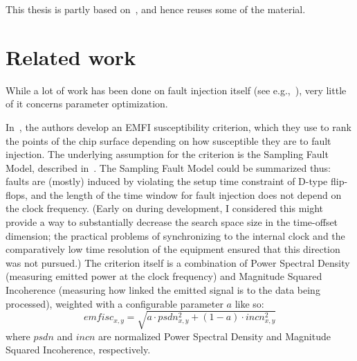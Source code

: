 \documentclass[times, utf8, diplomski]{fer}
\begin{document}


This thesis is partly based on~\cite{paper_FDTC2018}, and hence reuses some
of the material.

\section{Related work}\label{sec:related_work}
While a lot of work has been done on fault injection itself (see
e.g.,~\cite{Kommerling, boneh_demillo_lipton, nsamwel_africacrypt, impeccable_circuits, FI_crowbars}),
very little of it concerns parameter optimization.

In~\cite{madau2017fault}, the authors develop an EMFI susceptibility criterion,
which they use to rank the points of the chip surface depending on how susceptible
they are to fault injection. The underlying assumption for the criterion is the
Sampling Fault Model, described in~\cite{ordas2015injection}. The Sampling Fault
Model could be summarized thus: faults are (mostly) induced by violating the
setup time constraint of D-type flip-flops, and the length of the time window
for fault injection does not depend on the clock frequency. (Early on during
development, I considered this might provide a way to substantially decrease
the search space size in the time-offset dimension; the practical problems of
synchronizing to the internal clock and the comparatively low time resolution
of the equipment ensured that this direction was not pursued.) The criterion
itself is a combination of Power Spectral Density (measuring emitted power at
the clock frequency) and Magnitude Squared Incoherence (measuring how linked
the emitted signal is to the data being processed), weighted with a configurable
parameter $a$ like so:
\[
    emfisc_{x,y} = \sqrt{a \cdot psdn_{x,y}^2   +   (1-a) \cdot incn_{x,y}^2}
\]
where $psdn$ and $incn$ are normalized Power Spectral Density and Magnitude
Squared Incoherence, respectively.
\end{document}
